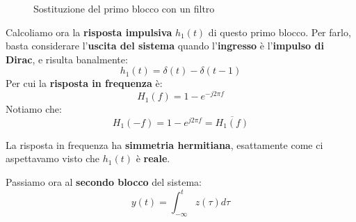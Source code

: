 \begin{figure}[!ht]
    \centering
    \caption{Sostituzione del primo blocco con un filtro}
    \label{fig:Es_01_02_Esercizio1_SistemaFiltro}
\end{figure}

Calcoliamo ora la \textbf{risposta impulsiva} $h_{1}(t)$ di questo primo blocco.
Per farlo, basta considerare l'\textbf{uscita del sistema} 
quando l'\textbf{ingresso} è l'\textbf{impulso di Dirac}, e risulta
banalmente:
\[
    h_{1}(t) = \delta(t) - \delta(t-1)
\]
Per cui la \textbf{risposta in frequenza} è:
\[
    H_{1}(f) = 1 - e^{-j 2\pi f}
\]
Notiamo che:
\[
    H_{1}(-f) = 1 - e^{j 2\pi f} = \overline{H_{1}(f)} 
\]

\begin{remark}
    La risposta in frequenza ha \textbf{simmetria hermitiana}, esattamente
    come ci aspettavamo visto che $h_{1}(t)$ è \textbf{reale}.
\end{remark}

Passiamo ora al \textbf{secondo blocco} del sistema:
\[
    y(t) = \int_{-\infty}^t z(\tau ) d \tau
\]

